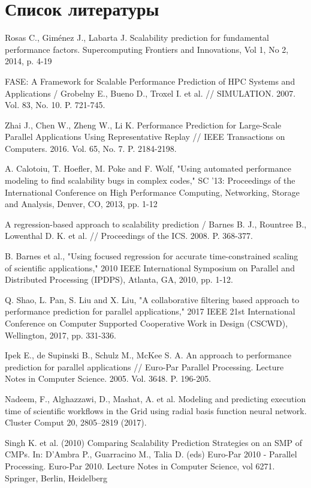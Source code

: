 \chapter{Список литературы}
	\begin{thebibliography}{00}

		Rosas C., Giménez J., Labarta J. Scalability prediction for fundamental
		performance factors. Supercomputing Frontiers and Innovations, Vol 1, No 2,
		2014, p. 4-19

		FASE: A Framework for Scalable Performance Prediction of HPC Systems and Applications
		/ Grobelny E., Bueno D., Troxel I. et al. // SIMULATION. 2007. Vol. 83, No. 10. P. 721-745.

		Zhai J., Chen W., Zheng W., Li K. Performance Prediction for Large-Scale Parallel
		Applications Using Representative Replay // IEEE Transactions on Computers. 2016. Vol. 65,
		No. 7. P. 2184-2198.

		A. Calotoiu, T. Hoefler, M. Poke and F. Wolf, "Using automated performance modeling
		to find scalability bugs in complex codes," SC '13: Proceedings of the International
		Conference on High Performance Computing, Networking, Storage and Analysis, Denver,
		CO, 2013, pp. 1-12

		A regression-based approach to scalability prediction / Barnes B. J., Rountree B., Lowenthal
		D. K. et al. // Proceedings of the ICS. 2008. P. 368-377.

		B. Barnes et al., "Using focused regression for accurate time-constrained scaling of scientific applications," 2010 IEEE International Symposium on Parallel and Distributed Processing (IPDPS), Atlanta, GA, 2010, pp. 1-12.

		Q. Shao, L. Pan, S. Liu and X. Liu, "A collaborative filtering based approach to performance prediction for parallel applications," 2017 IEEE 21st International Conference on Computer Supported Cooperative Work in Design (CSCWD), Wellington, 2017, pp. 331-336.

		Ipek E., de Supinski B., Schulz M., McKee S. A. An approach to performance prediction for
		parallel applications // Euro-Par Parallel Processing. Lecture Notes in Computer Science. 2005.
		Vol. 3648. P. 196-205.

		Nadeem, F., Alghazzawi, D., Mashat, A. et al. Modeling and predicting execution time of scientific workflows in the Grid using radial basis function neural network. Cluster Comput 20, 2805–2819 (2017).

		Singh K. et al. (2010) Comparing Scalability Prediction Strategies on an SMP of CMPs. In: D’Ambra P., Guarracino M., Talia D. (eds) Euro-Par 2010 - Parallel Processing. Euro-Par 2010. Lecture Notes in Computer Science, vol 6271. Springer, Berlin, Heidelberg

		

	\end{thebibliography}
\clearpage